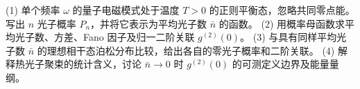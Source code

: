 (1) 单个频率 \(\omega\) 的量子电磁模式处于温度 \(T>0\) 的正则平衡态，忽略共同零点能。写出 \(n\) 光子概率 \(P_n\)，并将它表示为平均光子数 \(\bar n\) 的函数。
(2) 用概率母函数求平均光子数、方差、Fano 因子及归一二阶关联 \(g^{(2)}(0)\)。
(3) 与具有同样平均光子数 \(\bar n\) 的理想相干态泊松分布比较，给出各自的零光子概率和二阶关联。
(4) 解释热光子聚束的统计含义，讨论 \(\bar n\to0\) 时 \(g^{(2)}(0)\) 的可测定义边界及能量量纲。
